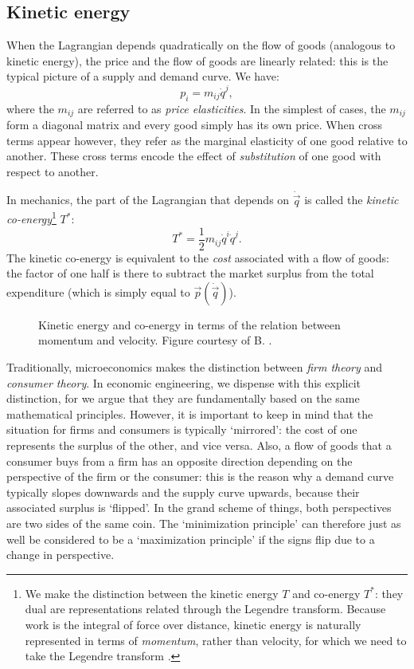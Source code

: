 \subsection{Kinetic energy} When the Lagrangian depends quadratically on the flow of goods (analogous to kinetic energy), the price and the flow of goods are linearly related: this is the typical picture of a supply and demand curve. We have:
\begin{equation}
     p_i = m_{ij} \dot{q}^j,
\end{equation}
where the \(m_{ij}\) are referred to as \emph{price elasticities}. In the simplest of cases, the \(m_{ij}\) form a diagonal matrix and every good simply has its own price. When cross terms appear however, they refer as the marginal elasticity of one good relative to another. These cross terms encode the effect of \emph{substitution} of one good with respect to another. 

In mechanics, the part of the Lagrangian that depends on \(\dot{\vec{q}}\) is called the \emph{kinetic co-energy}\footnote{We make the distinction between the kinetic energy \(T\) and co-energy \(T^*\): they dual are representations related through the Legendre transform. Because work is the integral of force over distance, kinetic energy is naturally represented in terms of \emph{momentum}, rather than velocity, for which we need to take the Legendre transform \cite{Jeltsema2009}.} \(T^*\):
\begin{equation}
    T^* = \frac{1}{2}m_{ij}\dot{q}^i \dot{q}^j.
\end{equation} 
The kinetic co-energy is equivalent to the \emph{cost} associated with a flow of goods: the factor of one half is there to subtract the market surplus from the total expenditure (which is simply equal to \(\vec{p}(\dot{\vec{q}})\)).

\begin{figure}
    \centering
    
    \caption{Kinetic energy and co-energy in terms of the relation between momentum and velocity. Figure courtesy of B. \citet{Krabbenborg2021}.}
    \label{fig:kinetic_energy}
\end{figure}

Traditionally, microeconomics makes the distinction between \emph{firm theory} and \emph{consumer theory}. In economic engineering, we dispense with this explicit distinction, for we argue that they are fundamentally based on the same mathematical principles. However, it is important to keep in mind that the situation for firms and consumers is typically `mirrored': the cost of one represents the surplus of the other, and vice versa. Also, a flow of goods that a consumer buys from a firm has an opposite direction depending on the perspective of the firm or the consumer: this is the reason why a demand curve typically slopes downwards and the supply curve upwards, because their associated surplus is `flipped'. In the grand scheme of things, both perspectives are two sides of the same coin. The `minimization principle' can therefore just as well be considered to be a `maximization principle' if the signs flip due to a change in perspective.

